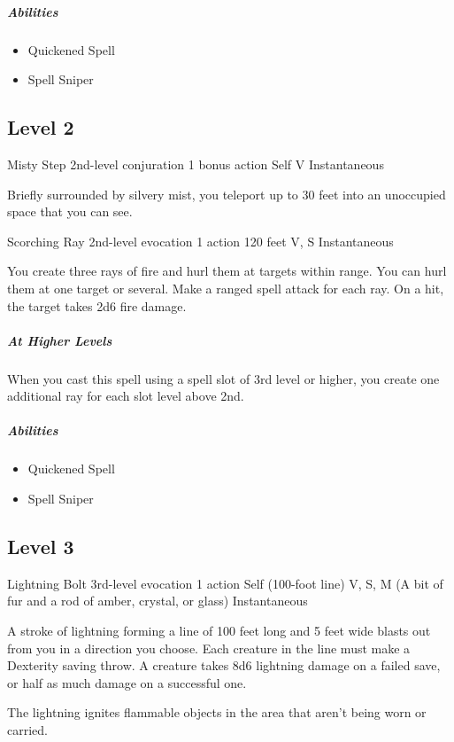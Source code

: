 \documentclass[letterpaper,openany,oneside,twocolumn]{book}
\begin{document}
\subparagraph*{Abilities}
\begin{itemize} 
  \item Quickened Spell
  \item Spell Sniper
\end{itemize}

\subsection*{Level 2}

\DndSpellHeader
  {Misty Step}
  {2nd-level conjuration}
  {1 bonus action}
  {Self}
  {V}
  {Instantaneous}

Briefly surrounded by silvery mist, you teleport up to 30 feet into an unoccupied space that you can see.

\DndSpellHeader
  {Scorching Ray}
  {2nd-level evocation}
  {1 action}
  {120 feet}
  {V, S}
  {Instantaneous}

You create three rays of fire and hurl them at targets within range. You can hurl them at one target or several. Make a ranged spell attack for each ray. On a hit, the target takes 2d6 fire damage.

\subparagraph*{At Higher Levels} When you cast this spell using a spell slot of 3rd level or higher, you create one additional ray for each slot level above 2nd.

\subparagraph*{Abilities}
\begin{itemize}
  \item Quickened Spell
  \item Spell Sniper
\end{itemize}

\subsection*{Level 3}

\DndSpellHeader
  {Lightning Bolt}
  {3rd-level evocation}
  {1 action}
  {Self (100-foot line)}
  {V, S, M (A bit of fur and a rod of amber, crystal, or glass)}
  {Instantaneous}

A stroke of lightning forming a line of 100 feet long and 5 feet wide blasts out from you in a direction you choose. Each creature in the line must make a Dexterity saving throw. A creature takes 8d6 lightning damage on a failed save, or half as much damage on a successful one.

The lightning ignites flammable objects in the area that aren't being worn or carried.
\end{document}
